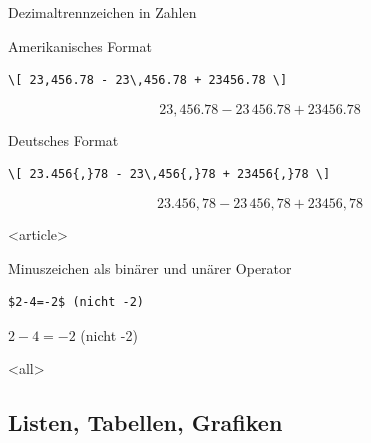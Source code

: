 \begin{Frame}[fragile]{Dezimaltrennzeichen in Zahlen}
  \begin{Block}{Amerikanisches Format}
    \begin{lstlisting}[gobble=6,style=block]
      \[ 23,456.78 - 23\,456.78 + 23456.78 \]
    \end{lstlisting}

    \[ 23,456.78 - 23\,456.78 + 23456.78 \]
  \end{Block}

  \xxx

  \begin{Block}{Deutsches Format}
    \begin{lstlisting}[gobble=6,style=block]
      \[ 23.456{,}78 - 23\,456{,}78 + 23456{,}78 \]
    \end{lstlisting}

    \[ 23.456{,}78 - 23\,456{,}78 + 23456{,}78 \]
  \end{Block}
\end{Frame}

\mode
<article>

\begin{Block}{Minuszeichen als binärer und unärer Operator}
  \begin{lstlisting}[gobble=8]
    $2-4=-2$ (nicht -2)
  \end{lstlisting}
  $2-4=-2$ (nicht -2)
\end{Block}

\mode
<all>

\subsection{Listen, Tabellen, Grafiken}

